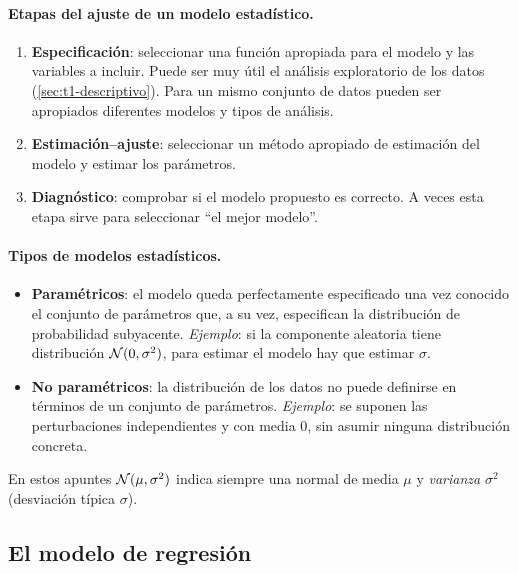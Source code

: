 \paragraph{Etapas del ajuste de un modelo estadístico.}
\begin{enumerate}
  \item \textbf{Especificación}: seleccionar una función apropiada para el modelo y las
    variables a incluir. Puede ser muy útil el análisis exploratorio de los datos
    (\cref{sec:t1-descriptivo}). Para un mismo conjunto de datos pueden ser apropiados
    diferentes modelos y tipos de análisis.
  \item \textbf{Estimación--ajuste}: seleccionar un método apropiado de estimación del
    modelo y estimar los parámetros.
  \item \textbf{Diagnóstico}: comprobar si el modelo propuesto es correcto. A veces esta etapa sirve
    para seleccionar ``el mejor modelo''.
\end{enumerate}

\paragraph{Tipos de modelos estadísticos.}
\begin{itemize}
  \item \textbf{Paramétricos}: el modelo queda perfectamente especificado una vez conocido
    el conjunto de parámetros que, a su vez, especifican la distribución de probabilidad
    subyacente. \emph{Ejemplo}: si la componente aleatoria tiene distribución
    $\mathcal{N}(0,\sigma^2)$, para estimar el modelo hay que estimar $\sigma$.
  \item \textbf{No paramétricos}: la distribución de los datos no puede definirse en
    términos de un conjunto de parámetros. \emph{Ejemplo}: se suponen las perturbaciones
    independientes y con media 0, sin asumir ninguna distribución concreta.
\end{itemize}

\begin{nota}[Notación]
  En estos apuntes $\mathcal{N}(\mu,\sigma^2)$ indica siempre una normal de media $\mu$ y
  \emph{varianza} $\sigma^2$ (desviación típica $\sigma$).
\end{nota}

\subsection{El modelo de regresión}

